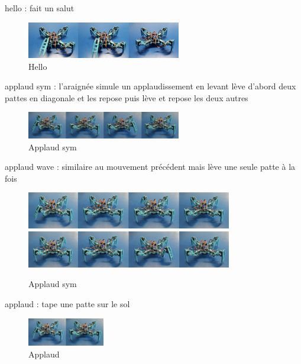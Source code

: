 hello : fait un salut

\begin{figure}[H]
	\begin{center}
		\includegraphics[width=0.6\textwidth]{./img/hello}
		\caption{Hello}
	\end{center}
\end{figure}

applaud sym : l'araignée simule un applaudissement en levant lève d'abord deux pattes en diagonale et les repose puis lève et repose les deux autres

\begin{figure}[H]
	\begin{center}
		\includegraphics[width=0.6\textwidth]{./img/applaud_sym}
		\caption{Applaud sym}
	\end{center}
\end{figure}

applaud wave : similaire au mouvement précédent mais lève une seule patte à la fois

\begin{figure}[H]
	\begin{center}
		\includegraphics[width=0.8\textwidth]{./img/applaud_wave_1}
		\includegraphics[width=0.8\textwidth]{./img/applaud_wave_2}
		\caption{Applaud sym}
	\end{center}
\end{figure}

applaud : tape une patte sur le sol

\begin{figure}[H]
	\begin{center}
		\includegraphics[width=0.3\textwidth]{./img/applaud}
		\caption{Applaud}
	\end{center}
\end{figure}


